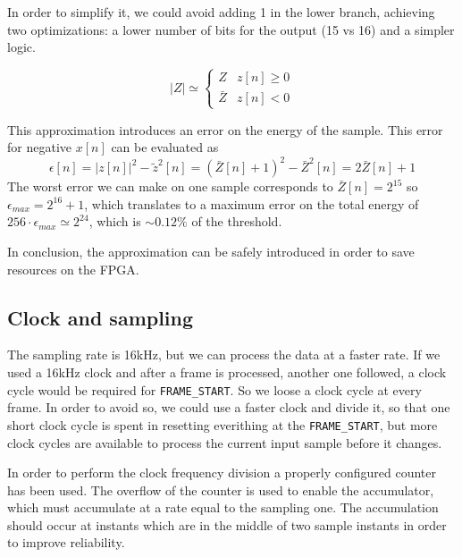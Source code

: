 In order to simplify it, we could avoid adding 1 in the lower branch, achieving 
two optimizations: a lower number of bits for the output (15 vs 16) and a 
simpler logic.

\begin{equation}
  |Z| \simeq \begin{cases}
    Z & z[n] \ge 0 \\
    \bar{Z} & z[n] < 0
  \end{cases}
\end{equation}

This approximation introduces an error on the energy of the sample. 
This error for negative $x[n]$ can be evaluated as
\begin{equation}
  \epsilon[n] = |z[n]|^2 - \tilde{z}^2[n] = (\bar{Z}[n] + 1)^2 - \bar{Z}^2[n] = 2\bar{Z}[n] + 1
\end{equation}
The worst error we can make on one sample corresponds to $\bar{Z}[n] = 2^{15}$
so $\epsilon_{max} = 2^{16}+1$, which translates to a maximum error on the total 
energy of $256 \cdot \epsilon_{max} \simeq 2^{24}$, which is $\sim 0.12\%$ of the 
threshold. 

In conclusion, the approximation can be safely introduced in order to save 
resources on the FPGA.

\subsection{Clock and sampling}
The sampling rate is 16\si{\kilo\hertz}, but we can process the data at a faster
rate. If we used a 16\si{\kilo\hertz} clock and after a frame is processed,
another one followed, a clock cycle would be required for \texttt{FRAME\_START}.
So we loose a clock cycle at every frame. In order to avoid so, we could use a
faster clock and divide it, so that one short clock cycle is spent in resetting
everithing at the \texttt{FRAME\_START}, but more clock cycles are
available to process the current input sample before it changes.

In order to perform the clock frequency division a properly configured counter 
has been used. The overflow of the counter is used to enable the accumulator, 
which must accumulate at a rate equal to the sampling one.
The accumulation should occur at instants which are in the middle of two sample
instants in order to improve reliability.
